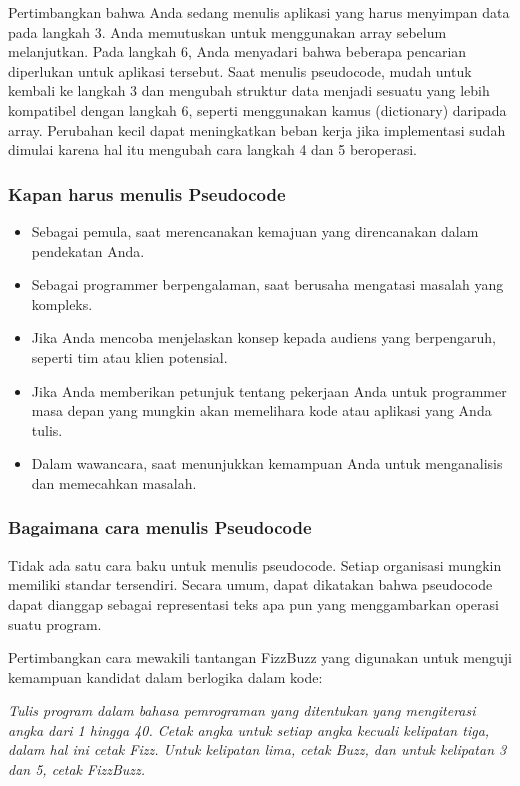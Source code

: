 \documentclass{article}
\begin{document}
Pertimbangkan bahwa Anda sedang menulis aplikasi yang harus menyimpan data pada langkah 3. Anda memutuskan untuk menggunakan array sebelum melanjutkan. Pada langkah 6, Anda menyadari bahwa beberapa pencarian diperlukan untuk aplikasi tersebut. Saat menulis pseudocode, mudah untuk kembali ke langkah 3 dan mengubah struktur data menjadi sesuatu yang lebih kompatibel dengan langkah 6, seperti menggunakan kamus (dictionary) daripada array. Perubahan kecil dapat meningkatkan beban kerja jika implementasi sudah dimulai karena hal itu mengubah cara langkah 4 dan 5 beroperasi.

\subsubsection{Kapan harus menulis Pseudocode}
\begin{itemize}
    \item Sebagai pemula, saat merencanakan kemajuan yang direncanakan dalam pendekatan Anda.
    \item Sebagai programmer berpengalaman, saat berusaha mengatasi masalah yang kompleks.
    \item Jika Anda mencoba menjelaskan konsep kepada audiens yang berpengaruh, seperti tim atau klien potensial.
    \item Jika Anda memberikan petunjuk tentang pekerjaan Anda untuk programmer masa depan yang mungkin akan memelihara kode atau aplikasi yang Anda tulis.
    \item Dalam wawancara, saat menunjukkan kemampuan Anda untuk menganalisis dan memecahkan masalah.
\end{itemize}

\subsubsection{Bagaimana cara menulis Pseudocode}
Tidak ada satu cara baku untuk menulis pseudocode. Setiap organisasi mungkin memiliki standar tersendiri. Secara umum, dapat dikatakan bahwa pseudocode dapat dianggap sebagai representasi teks apa pun yang menggambarkan operasi suatu program.

Pertimbangkan cara mewakili tantangan FizzBuzz yang digunakan untuk menguji kemampuan kandidat dalam berlogika dalam kode:

\textit{Tulis program dalam bahasa pemrograman yang ditentukan yang mengiterasi angka dari 1 hingga 40. Cetak angka untuk setiap angka kecuali kelipatan tiga, dalam hal ini cetak Fizz. Untuk kelipatan lima, cetak Buzz, dan untuk kelipatan 3 dan 5, cetak FizzBuzz.}
\end{document}
